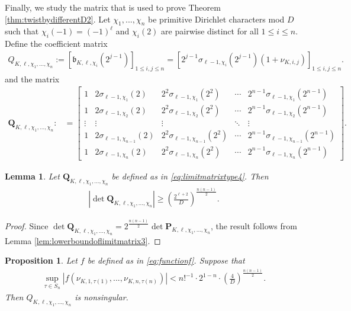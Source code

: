 \documentclass[11pt,letterpaper,reqno]{amsart}
\numberwithin{figure}{section}
\numberwithin{table}{section}
\theoremstyle{definition}
\theoremstyle{plain}
\newtheorem{lemma}[theorem]{Lemma}
\newtheorem{proposition}[theorem]{Proposition}
\theoremstyle{definition}
\theoremstyle{definition}
\theoremstyle{remark}
\numberwithin{equation}{section}
\theoremstyle{remark}
\begin{document}
Finally, we study the matrix that is used to prove Theorem \ref{thm:twistbydifferentD2}.
Let $\chi_1,...,\chi_n$ be primitive Dirichlet characters mod $D$ such that $\chi_i(-1)=(-1)^{\ell}$  and $\chi_i(2)$ are pairwise distinct for all $1\leq i\leq n$. 
Define the coefficient matrix
\begin{align}
    Q_{K,\ell,\chi_1,...,\chi_n}:=\left[\mathfrak{b}_{K,\ell,\chi_i}(2^{j-1})\right]_{1\leq i,j\leq n}=\left[2^{j-1}\sigma_{\ell-1,\chi_i}(2^{j-1})(1+\nu_{K,i,j})\right]_{1\leq i,j\leq n}.\label{eq:matrix4}
\end{align}
and the matrix
\begin{align}
\mathbf{Q}_{K,\ell,\chi_1,...,\chi_n}:&=\begin{bmatrix}
        1 & 2\sigma_{\ell-1,\chi_1}(2) & 2^2\sigma_{\ell-1,\chi_1}(2^2) & \cdots & 2^{n-1}\sigma_{\ell-1,\chi_1}(2^{n-1})\\
        1 &  2\sigma_{\ell-1,\chi_2}(2) &  2^2\sigma_{\ell-1,\chi_2}(2^2) & \cdots &  2^{n-1}\sigma_{\ell-1,\chi_2}(2^{n-1})\\
        \vdots & \vdots & \vdots & \ddots & \vdots\\
        1 & 2\sigma_{\ell-1,\chi_{n-1}}(2) & 2^2\sigma_{\ell-1,\chi_{n-1}}(2^2) & \cdots & 2^{n-1}\sigma_{\ell-1,\chi_{n-1}}(2^{n-1})\\ 
        1 & 2\sigma_{\ell-1,\chi_n}(2) & 2^2\sigma_{\ell-1,\chi_n}(2^2) & \cdots & 2^{n-1}\sigma_{\ell-1,\chi_n}(2^{n-1})
    \end{bmatrix}.\label{eq:limitmatrixtype4}
\end{align}
\begin{lemma}\label{lem:lowerboundoflimitmatrix4}
   Let $\mathbf{Q}_{K,\ell,\chi_1,...,\chi_n}$ be defined as in \eqref{eq:limitmatrixtype4}. Then 
   \begin{align*}
\left|\det \mathbf{Q}_{K,\ell,\chi_1,...,\chi_n}\right|\geq\left(\frac{2^{\ell+2}}{D}\right)^{\frac{n(n-1)}{2}}.
   \end{align*}
\end{lemma}
\begin{proof}
  Since  $\det \mathbf{Q}_{K,\ell,\chi_1,...,\chi_n}=2^{\frac{n(n-1)}{2}}\det\mathbf{P}_{K,\ell,\chi_1,...,\chi_n}$, the result follows from Lemma \ref{lem:lowerboundoflimitmatrix3}.
\end{proof}
\begin{proposition}
    Let $f$ be defined as in \eqref{eq:functionf}.  Suppose that 
    \begin{align*}
        \sup_{\tau\in S_n}|f(\nu_{K,1,\tau(1)},...,\nu_{K,n,\tau(n)})|<n!^{-1}\cdot2^{1-n}\cdot\left(\frac{4}{D}\right)^{\frac{n(n-1)}{2}}.
    \end{align*}
    Then $Q_{K,\ell,\chi_1,...,\chi_n}$ is nonsingular.
\end{proposition}
\end{document}
